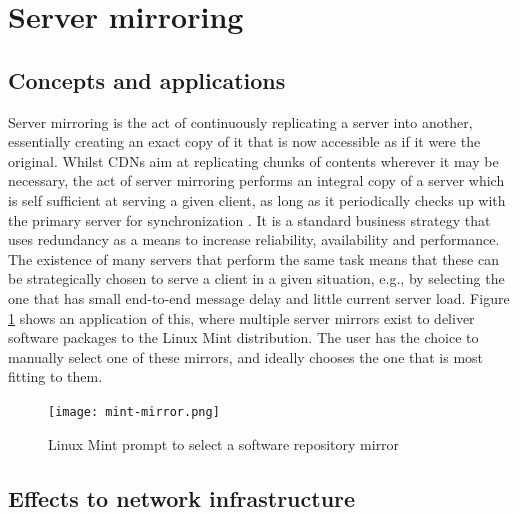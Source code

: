 

\section{Server mirroring}

\subsection{Concepts and applications}

    Server mirroring is the act of continuously replicating a server into another, essentially creating an exact copy of it that is now accessible as if it were the original.
    Whilst CDNs aim at replicating chunks of contents wherever it may be necessary, the act of server mirroring performs an integral copy of a server which is self sufficient at serving a given client, as long as it periodically checks up with the primary server for synchronization .
    It is a standard business strategy that uses redundancy as a means to increase reliability, availability and performance.
    The existence of many servers that perform the same task means that these can be strategically chosen to serve a client in a given situation, e.g., by selecting the one that has small end-to-end message delay and little current server load.
    Figure \ref{fig:mint-mirrors} shows an application of this, where multiple server mirrors exist to deliver software packages to the Linux Mint distribution. The user has the choice to manually select one of these mirrors, and ideally chooses the one that is most fitting to them.

\begin{figure}[!h]
\centering
\texttt{[image: mint-mirror.png]}
\caption{Linux Mint prompt to select a software repository mirror}
\label{fig:mint-mirrors}
\end{figure}

\subsection{Effects to network infrastructure}

